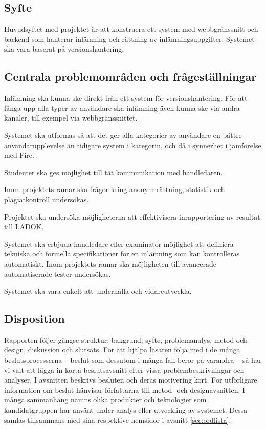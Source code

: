 \subsection{Syfte}

Huvudsyftet med projektet är att konstruera ett system med webbgränssnitt och
backend som hanterar inlämning och rättning av inlämningsuppgifter. Systemet ska
vara baserat på versionshantering.

\subsection{Centrala problemområden och frågeställningar}

Inlämning ska kunna ske direkt från ett system för versionshantering. För att fånga upp alla typer av användare ska inlämning även kunna ske via andra kanaler, till exempel via webbgränssnittet.

Systemet ska utformas så att det ger alla kategorier av användare en bättre användarupplevelse än tidigare system i kategorin, och då i synnerhet i jämförelse med Fire.

Studenter ska ges möjlighet till tät kommunikation med handledaren.

Inom projektets ramar ska frågor kring anonym rättning, statistik och plagiatkontroll undersökas.

Projektet ska undersöka möjligheterna att effektivisera inrapportering av resultat till LADOK.

Systemet ska erbjuda handledare eller examinator möjlighet att definiera tekniska och formella specifikationer för en inlämning som kan kontrolleras automatiskt. Inom projektets ramar ska möjligheten till avancerade automatiserade tester undersökas.

Systemet ska vara enkelt att underhålla och vidareutveckla.

\subsection{Disposition}

Rapporten följer gängse struktur: bakgrund, syfte, problemanalys, metod och design, diskussion och slutsats. För att hjälpa läsaren följa med i de många beslutsprocesserna – beslut som dessutom i många fall beror på varandra – så har vi valt att lägga in korta beslutsavsnitt efter vissa  problembeskrivningar och analyser. I avsnitten beskrivs besluten och deras motivering kort. För utförligare information om beslut hänvisar författarna till metod- och designavsnitten.
I många sammanhang nämns olika produkter och teknologier som kandidatgruppen har använt under analys eller utveckling av systemet. Dessa samlas tillsammans med sina respektive hemsidor i avsnitt \ref{sec:ordlista}.
